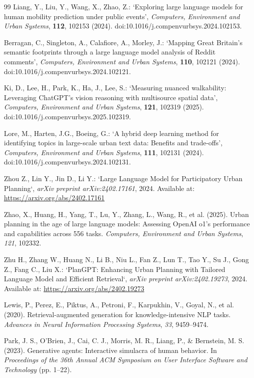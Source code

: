 \documentclass[a4paper,fleqn]{cas-sc}
\begin{document}
\begin{thebibliography}{99}
Liang, Y., Liu, Y., Wang, X., Zhao, Z.:
`Exploring large language models for human mobility prediction under public events',
\textit{Computers, Environment and Urban Systems}, \textbf{112}, 102153 (2024).
doi:10.1016/j.compenvurbsys.2024.102153.

Berragan, C., Singleton, A., Calafiore, A., Morley, J.:
`Mapping Great Britain's semantic footprints through a large language model analysis of Reddit comments',
\textit{Computers, Environment and Urban Systems}, \textbf{110}, 102121 (2024).
doi:10.1016/j.compenvurbsys.2024.102121.

Ki, D., Lee, H., Park, K., Ha, J., Lee, S.:
`Measuring nuanced walkability: Leveraging ChatGPT's vision reasoning with multisource spatial data',
\textit{Computers, Environment and Urban Systems}, \textbf{121}, 102319 (2025).
doi:10.1016/j.compenvurbsys.2025.102319.

Lore, M., Harten, J.G., Boeing, G.:
`A hybrid deep learning method for identifying topics in large-scale urban text data: Benefits and trade-offs',
\textit{Computers, Environment and Urban Systems}, \textbf{111}, 102131 (2024).
doi:10.1016/j.compenvurbsys.2024.102131.

Zhou Z., Lin Y., Jin D., Li Y.:  
`Large Language Model for Participatory Urban Planning`, \textit{arXiv preprint arXiv:2402.17161}, 2024. Available at: \url{https://arxiv.org/abs/2402.17161}

Zhao, X., Huang, H., Yang, T., Lu, Y., Zhang, L.,
Wang, R., et al. (2025).
Urban planning in the age of large language models:
Assessing OpenAI o1's performance and capabilities across 556 tasks.
\textit{Computers, Environment and Urban Systems},
\textit{121}, 102332.

Zhu H., Zhang W., Huang N., Li B., Niu L., Fan Z., Lun T., Tao Y., Su J., Gong Z., Fang C., Liu X.:  
`PlanGPT: Enhancing Urban Planning with Tailored Language Model and Efficient Retrieval`, \textit{arXiv preprint arXiv:2402.19273}, 2024. Available at: \url{https://arxiv.org/abs/2402.19273}

Lewis, P., Perez, E., Piktus, A., Petroni, F.,
Karpukhin, V., Goyal, N., et al. (2020).
Retrieval-augmented generation for knowledge-intensive NLP tasks.
\textit{Advances in Neural Information Processing Systems},
\textit{33}, 9459--9474.

Park, J. S., O'Brien, J., Cai, C. J., Morris, M. R.,
Liang, P., \& Bernstein, M. S. (2023).
Generative agents: Interactive simulacra of human behavior.
In \textit{Proceedings of the 36th Annual ACM Symposium
on User Interface Software and Technology} (pp. 1--22).


\end{thebibliography}
\end{document}

